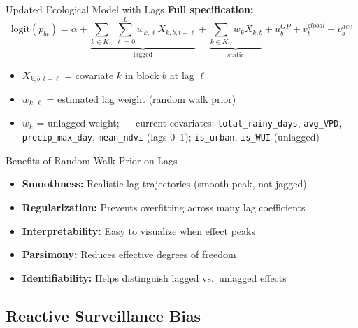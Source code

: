 \documentclass[aspectratio=169]{beamer}
\begin{document}
\begin{frame}{Updated Ecological Model with Lags}
  \textbf{Full specification:}
  \begin{equation*}
    \text{logit}(p_{bt}) = \alpha + \underbrace{\sum_{k \in K_L} \sum_{\ell=0}^{L} w_{k,\ell} X_{k,b,t-\ell}}_{\text{lagged}} + \underbrace{\sum_{k \in K_U} w_k X_{k,b}}_{\text{static}} + u_b^{GP} + v_t^{global} + v_b^{dev}
  \end{equation*}

  \begin{itemize}
    \item $X_{k,b,t-\ell}$ = covariate $k$ in block $b$ at lag $\ell$
    \item $w_{k,\ell}$ = estimated lag weight (random walk prior)
    \item $w_k$ = unlagged weight; $\quad$ current covariates: \texttt{total\_rainy\_days}, \texttt{avg\_VPD}, \texttt{precip\_max\_day}, \texttt{mean\_ndvi} (lags 0--1); \texttt{is\_urban}, \texttt{is\_WUI} (unlagged)
  \end{itemize}
\end{frame}

\begin{frame}{Benefits of Random Walk Prior on Lags}
  \begin{itemize}
    \item \textbf{Smoothness:} Realistic lag trajectories (smooth peak, not jagged)
    \item \textbf{Regularization:} Prevents overfitting across many lag coefficients
    \item \textbf{Interpretability:} Easy to visualize when effect peaks
    \item \textbf{Parsimony:} Reduces effective degrees of freedom
    \item \textbf{Identifiability:} Helps distinguish lagged vs.\ unlagged effects
  \end{itemize}
\end{frame}

\subsection{Reactive Surveillance Bias}
\end{document}
